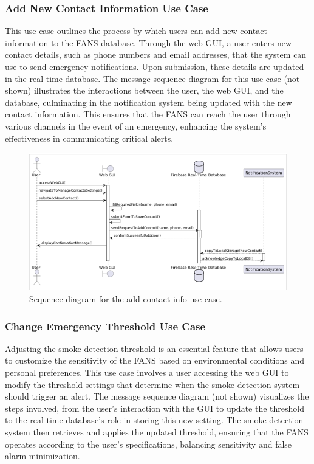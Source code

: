 \subsubsection{Add New Contact Information Use Case}

This use case outlines the process by which users can add new contact information to the FANS database. Through the web
GUI, a user enters new contact details, such as phone numbers and email addresses, that the system can use to send
emergency notifications. Upon submission, these details are updated in the real-time database. The message sequence
diagram for this use case (not shown) illustrates the interactions between the user, the web GUI, and the database,
culminating in the notification system being updated with the new contact information. This ensures that the FANS can
reach the user through various channels in the event of an emergency, enhancing the system's effectiveness in
communicating critical alerts.

\begin{figure}[H]
    \centering
    \includegraphics[width=\linewidth]{../assets/sequence/AddingNewContactInformationSequenceDiagram.png}
    \caption{Sequence diagram for the add contact info use case.}
\end{figure}

\subsubsection{Change Emergency Threshold Use Case}

Adjusting the smoke detection threshold is an essential feature that allows users to customize the sensitivity of the
FANS based on environmental conditions and personal preferences. This use case involves a user accessing the web GUI to
modify the threshold settings that determine when the smoke detection system should trigger an alert. The message
sequence diagram (not shown) visualizes the steps involved, from the user's interaction with the GUI to update the
threshold to the real-time database's role in storing this new setting. The smoke detection system then retrieves and
applies the updated threshold, ensuring that the FANS operates according to the user's specifications, balancing
sensitivity and false alarm minimization.

